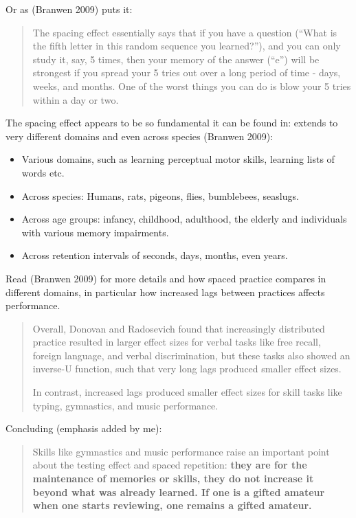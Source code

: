 Or as (Branwen 2009) puts it:

\begin{quote}
The spacing effect essentially says that if you have a question (``What
is the fifth letter in this random sequence you learned?''), and you can
only study it, say, 5 times, then your memory of the answer (``e'') will
be strongest if you spread your 5 tries out over a long period of time -
days, weeks, and months. One of the worst things you can do is blow your
5 tries within a day or two.
\end{quote}

The spacing effect appears to be so fundamental it can be found in:
extends to very different domains and even across species (Branwen
2009):

\begin{itemize}
\tightlist
\item
  Various domains, such as learning perceptual motor skills, learning
  lists of words etc.
\item
  Across species: Humans, rats, pigeons, flies, bumblebees, seaslugs.
\item
  Across age groups: infancy, childhood, adulthood, the elderly and
  individuals with various memory impairments.
\item
  Across retention intervals of seconds, days, months, even years.
\end{itemize}

Read (Branwen 2009) for more details and how spaced practice compares in
different domains, in particular how increased lags between practices
affects performance.

\begin{quote}
Overall, Donovan and Radosevich found that increasingly distributed
practice resulted in larger effect sizes for verbal tasks like free
recall, foreign language, and verbal discrimination, but these tasks
also showed an inverse-U function, such that very long lags produced
smaller effect sizes.

In contrast, increased lags produced smaller effect sizes for skill
tasks like typing, gymnastics, and music performance.
\end{quote}

Concluding (emphasis added by me):

\begin{quote}
Skills like gymnastics and music performance raise an important point
about the testing effect and spaced repetition: \textbf{they are for the
maintenance of memories or skills, they do not increase it beyond what
was already learned. If one is a gifted amateur when one starts
reviewing, one remains a gifted amateur.}
\end{quote}

